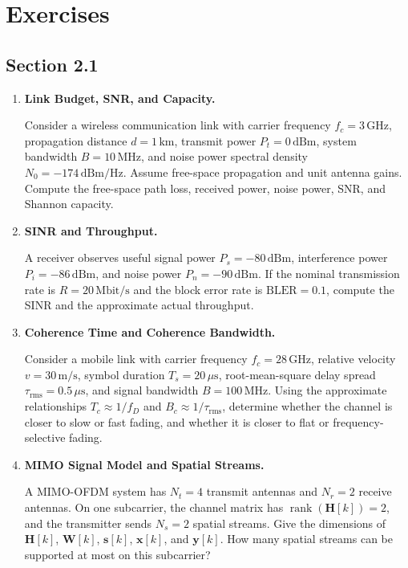 
\section*{Exercises}

\subsection*{Section 2.1}

\begin{enumerate}[label=\textbf{\arabic*.}, leftmargin=*]
    \item \textbf{Link Budget, SNR, and Capacity.}

    Consider a wireless communication link with carrier frequency
    \(f_c=3\,\mathrm{GHz}\), propagation distance \(d=1\,\mathrm{km}\),
    transmit power \(P_t=0\,\mathrm{dBm}\), system bandwidth
    \(B=10\,\mathrm{MHz}\), and noise power spectral density
    \(N_0=-174\,\mathrm{dBm/Hz}\). Assume free-space propagation and unit
    antenna gains.
    Compute the free-space path loss, received power, noise power, SNR, and
    Shannon capacity.

    \item \textbf{SINR and Throughput.}

    A receiver observes useful signal power \(P_s=-80\,\mathrm{dBm}\),
    interference power \(P_i=-86\,\mathrm{dBm}\), and noise power
    \(P_n=-90\,\mathrm{dBm}\). If the nominal transmission rate is
    \(R=20\,\mathrm{Mbit/s}\) and the block error rate is
    \(\mathrm{BLER}=0.1\), compute the SINR and the approximate actual
    throughput.

    \item \textbf{Coherence Time and Coherence Bandwidth.}

    Consider a mobile link with carrier frequency \(f_c=28\,\mathrm{GHz}\),
    relative velocity \(v=30\,\mathrm{m/s}\), symbol duration
    \(T_s=20\,\mu\mathrm{s}\), root-mean-square delay spread
    \(\tau_{\mathrm{rms}}=0.5\,\mu\mathrm{s}\), and signal bandwidth
    \(B=100\,\mathrm{MHz}\). Using the approximate relationships
    \(T_c\approx 1/f_D\) and \(B_c\approx 1/\tau_{\mathrm{rms}}\), determine
    whether the channel is closer to slow or fast fading, and whether it is
    closer to flat or frequency-selective fading.

    \item \textbf{MIMO Signal Model and Spatial Streams.}

    A MIMO-OFDM system has \(N_t=4\) transmit antennas and \(N_r=2\) receive
    antennas. On one subcarrier, the channel matrix has
    \(\operatorname{rank}(\mathbf{H}[k])=2\), and the transmitter sends
    \(N_s=2\) spatial streams.
    Give the dimensions of \(\mathbf{H}[k]\), \(\mathbf{W}[k]\),
    \(\mathbf{s}[k]\), \(\mathbf{x}[k]\), and \(\mathbf{y}[k]\). How many
    spatial streams can be supported at most on this subcarrier?

\end{enumerate}
